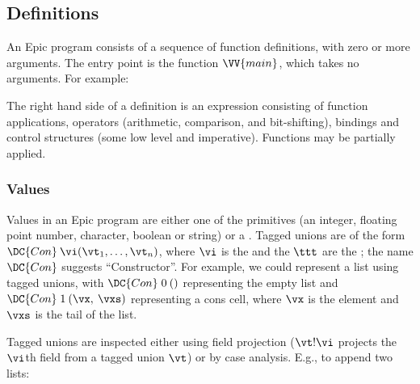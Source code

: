 \subsection{Definitions}

An Epic program consists of a sequence of  function
definitions, with zero or more arguments. The entry point is the
function $\VV{main}$, which takes no arguments. For example:


\noindent
The right hand side of a definition is an expression consisting of
function applications, operators (arithmetic, comparison, and
bit-shifting), bindings and control structures (some low level and
imperative).  Functions may be partially applied.

\subsubsection*{Values}

Values in an Epic program are either one of the primitives (an
integer, floating point number, character, boolean or string) or a
. Tagged unions are of the form $\DC{Con}\:
\vi(\vt_1,\ldots,\vt_n)$, where $\vi$ is the  and the $\ttt$
are the ; the name $\DC{Con}$ suggests
``Constructor''. For example, we could represent a list using tagged
unions, with $\DC{Con}\;0\:()$ representing the empty list and
$\DC{Con}\;1\:(\vx,\:\vxs)$ representing a cons cell, where $\vx$
is the element and $\vxs$ is the tail of the list.

Tagged unions are inspected either using field projection ($\vt!\vi$
projects the $\vi$th field from a tagged union $\vt$) or by case
analysis. E.g., to append two lists:


